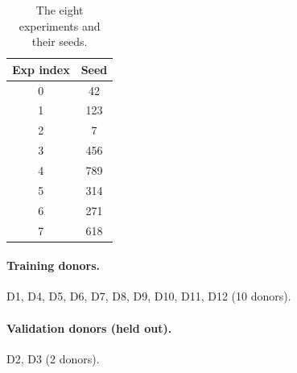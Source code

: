 \documentclass[11pt,a4paper]{article}
\begin{document}
\begin{table}[h]
\centering
\caption{The eight experiments and their seeds.}
\label{tab:experiments}
\small
\begin{tabular}{cc}
\toprule
\textbf{Exp index} & \textbf{Seed} \\
\midrule
0 & 42 \\
1 & 123 \\
2 & 7 \\
3 & 456 \\
4 & 789 \\
5 & 314 \\
6 & 271 \\
7 & 618 \\
\bottomrule
\end{tabular}
\end{table}

\paragraph{Training donors.} D1, D4, D5, D6, D7, D8, D9, D10, D11, D12 (10 donors).
\paragraph{Validation donors (held out).} D2, D3 (2 donors).
\end{document}

